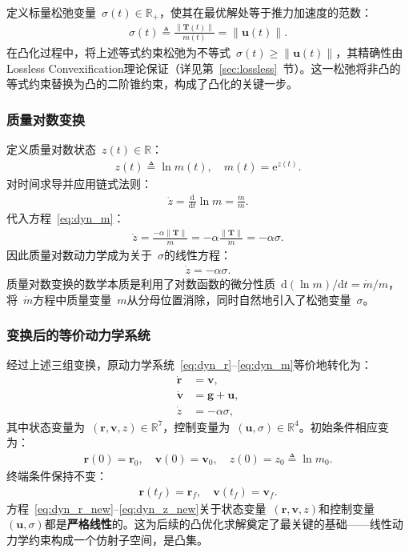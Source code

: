 定义标量松弛变量~$\sigma(t)\in\mathbb{R}_+$，使其在最优解处等于推力加速度的范数：
\begin{align}
\sigma(t) \triangleq \frac{\|\bm T(t)\|}{m(t)} = \|\bm u(t)\|.
\end{align}
在凸化过程中，将上述等式约束松弛为不等式~$\sigma(t)\ge\|\bm u(t)\|$，其精确性由Lossless Convexification理论保证（详见第~\ref{sec:lossless}~节）。这一松弛将非凸的等式约束替换为凸的二阶锥约束，构成了凸化的关键一步。

\subsubsection{质量对数变换}

定义质量对数状态~$z(t)\in\mathbb{R}$：
\begin{align}
z(t) \triangleq \ln m(t),\quad m(t) = \mathrm{e}^{z(t)}.
\end{align}
对时间求导并应用链式法则：
\begin{align}
\dot z = \frac{\mathrm{d}}{\mathrm{d}t}\ln m = \frac{\dot m}{m}.
\end{align}
代入方程~\eqref{eq:dyn_m}：
\begin{align}
\dot z = \frac{-\alpha\|\bm T\|}{m} = -\alpha\frac{\|\bm T\|}{m} = -\alpha\sigma.
\end{align}
因此质量对数动力学成为关于~$\sigma$的线性方程：
\begin{align}
\dot z = -\alpha\sigma.\label{eq:dyn_z}
\end{align}
质量对数变换的数学本质是利用了对数函数的微分性质~$\mathrm{d}(\ln m)/\mathrm{d}t = \dot m/m$，将~$\dot m$方程中质量变量~$m$从分母位置消除，同时自然地引入了松弛变量~$\sigma$。

\subsubsection{变换后的等价动力学系统}

经过上述三组变换，原动力学系统~\eqref{eq:dyn_r}--\eqref{eq:dyn_m}等价地转化为：
\begin{align}
\dot{\bm r} &= \bm v,\label{eq:dyn_r_new}\\
\dot{\bm v} &= \bm g + \bm u,\label{eq:dyn_v_new}\\
\dot z &= -\alpha\sigma,\label{eq:dyn_z_new}
\end{align}
其中状态变量为~$(\bm r,\bm v,z)\in\mathbb{R}^7$，控制变量为~$(\bm u,\sigma)\in\mathbb{R}^4$。初始条件相应变为：
\begin{align}
\bm r(0)=\bm r_0,\quad \bm v(0)=\bm v_0,\quad z(0)=z_0\triangleq\ln m_0.
\end{align}
终端条件保持不变：
\begin{align}
\bm r(t_f)=\bm r_f,\quad \bm v(t_f)=\bm v_f.
\end{align}
方程~\eqref{eq:dyn_r_new}--\eqref{eq:dyn_z_new}关于状态变量~$(\bm r,\bm v,z)$和控制变量~$(\bm u,\sigma)$都是\textbf{严格线性}的。这为后续的凸优化求解奠定了最关键的基础——线性动力学约束构成一个仿射子空间，是凸集。

